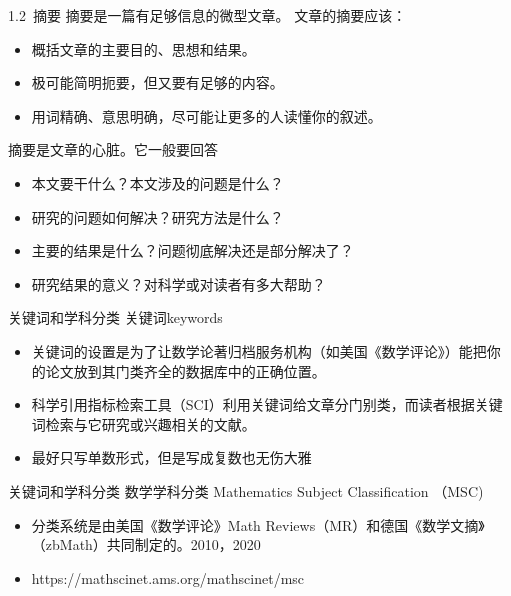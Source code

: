 \documentclass[13pt]{ctexbeamer}
\begin{document}
\begin{frame}{1.2~摘要}
摘要是一篇有足够信息的微型文章。	文章的摘要应该：
	\begin{itemize}
		\item 概括文章的主要目的、思想和结果。
		\item 极可能简明扼要，但又要有足够的内容。
		\item 用词精确、意思明确，尽可能让更多的人读懂你的叙述。
	\end{itemize}
	
摘要是文章的心脏。它一般要回答
	\begin{itemize}
		\item 本文要干什么？本文涉及的问题是什么？
		\item 研究的问题如何解决？研究方法是什么？
		\item 主要的结果是什么？问题彻底解决还是部分解决了？
		\item 研究结果的意义？对科学或对读者有多大帮助？
	\end{itemize}

\end{frame}


\begin{frame}{关键词和学科分类}
	关键词keywords
	\begin{itemize}
		
		\item 关键词的设置是为了让数学论著归档服务机构（如美国《数学评论》）能把你的论文放到其门类齐全的数据库中的正确位置。
		
		\item 科学引用指标检索工具（SCI）利用关键词给文章分门别类，而读者根据关键词检索与它研究或兴趣相关的文献。
		\item 最好只写单数形式，但是写成复数也无伤大雅
	\end{itemize}
\end{frame}


\begin{frame}{关键词和学科分类}
	数学学科分类 Mathematics Subject Classification  （MSC)
	\begin{itemize}
		
		\item 分类系统是由美国《数学评论》Math Reviews（MR）和德国《数学文摘》（zbMath）共同制定的。2010，2020
		
		\item https://mathscinet.ams.org/mathscinet/msc
	\end{itemize}
\end{frame}
\end{document}
